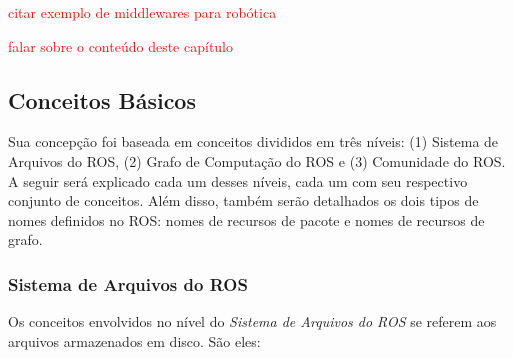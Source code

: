     	\textcolor{red}{citar exemplo de middlewares para robótica}
        
        \textcolor{red}{falar sobre o conteúdo deste capítulo}
        
        \subsection{Conceitos Básicos} \label{sec:ros_conceitos}
        
            Sua concepção foi baseada em conceitos divididos em três níveis: (1) Sistema de Arquivos do ROS, (2) Grafo de Computação do ROS e (3) Comunidade do ROS. A seguir será explicado cada um desses níveis, cada um com seu respectivo conjunto de conceitos. Além disso, também serão detalhados os dois tipos de nomes definidos no ROS: nomes de recursos de pacote e nomes de recursos de grafo.
            
            \subsubsection{Sistema de Arquivos do ROS}
                
                Os conceitos envolvidos no nível do \textit{Sistema de Arquivos do ROS} se referem aos arquivos armazenados em disco. São eles:
                
